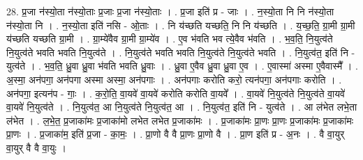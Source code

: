 \documentclass[17pt]{extarticle}
\begin{document}
28. प्र॒जा न॑स्यो॒ता न॑स्यो॒ताः प्र॒जाः प्र॒जा न॑स्यो॒ताः । . प्र॒जा इति॑ प्र - जाः । . न॒स्यो॒ता नि नि न॑स्यो॒ता न॑स्यो॒ता नि । . न॒स्यो॒ता इति॑ नसि - ओ॒ताः । . नि य॑च्छति यच्छति॒ नि नि य॑च्छति । . य॒च्छ॒ति॒ ग्रा॒मी ग्रा॒मी य॑च्छति यच्छति ग्रा॒मी । . ग्रा॒म्ये॑वैव ग्रा॒मी ग्रा॒म्ये॑व । . ए॒व भ॑वति भव त्ये॒वैव भ॑वति । . भ॒व॒ति॒ नि॒युत्व॑ते नि॒युत्व॑ते भवति भवति नि॒युत्व॑ते । . नि॒युत्व॑ते भवति भवति नि॒युत्व॑ते नि॒युत्व॑ते भवति । . नि॒युत्व॑त॒ इति॑ नि - युत्व॑ते । . भ॒व॒ति॒ ध्रु॒वा ध्रु॒वा भ॑वति भवति ध्रु॒वाः । . ध्रु॒वा ए॒वैव ध्रु॒वा ध्रु॒वा ए॒व । . ए॒वास्मा॑ अस्मा ए॒वैवास्मै᳚ । . अ॒स्मा॒ अन॑पगा॒ अन॑पगा अस्मा अस्मा॒ अन॑पगाः । . अन॑पगाः करोति करो॒ त्यन॑पगा॒ अन॑पगाः करोति । . अन॑पगा॒ इत्यन॑प - गाः॒ । . क॒रो॒ति॒ वा॒यवे॑ वा॒यवे॑ करोति करोति वा॒यवे᳚ । . वा॒यवे॑ नि॒युत्व॑ते नि॒युत्व॑ते वा॒यवे॑ वा॒यवे॑ नि॒युत्व॑ते । . नि॒युत्व॑त॒ आ नि॒युत्व॑ते नि॒युत्व॑त॒ आ । . नि॒युत्व॑त॒ इति॑ नि - युत्व॑ते । . आ ल॑भेत लभे॒ता ल॑भेत । . ल॒भे॒त॒ प्र॒जाका॑मः प्र॒जाका॑मो लभेत लभेत प्र॒जाका॑मः । . प्र॒जाका॑मः प्रा॒णः प्रा॒णः प्र॒जाका॑मः प्र॒जाका॑मः प्रा॒णः । . प्र॒जाका॑म॒ इति॑ प्र॒जा - का॒मः॒ । . प्रा॒णो वै वै प्रा॒णः प्रा॒णो वै । . प्रा॒ण इति॑ प्र - अ॒नः । . वै वा॒युर् वा॒युर् वै वै वा॒युः । \newline
\end{document}
